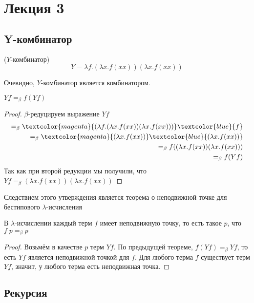\section{Лекция 3}

\subsection{Y-комбинатор}

\begin{definition}($Y$-комбинатор)
	\[
	Y = \lambda f . (\lambda x . f (x x)) (\lambda x . f (x x))
	\]
\end{definition}

Очевидно, $Y$-комбинатор является комбинатором.

\begin{theorem}
	$Y f =_{\beta} f (Y f)$
	
	\begin{proof}
		$\beta$-редуцируем выражение $Y f$
		\begin{align*}
			 =_{\beta} \textcolor{magenta}{(\lambda f . (\lambda x . f (x x)) (\lambda x . f (x x)))}\textcolor{blue}{f} \\ =_{\beta} \textcolor{magenta}{(\lambda x . f (x x))} \textcolor{blue}{(\lambda x . f (x x))} \\ =_{\beta} f ((\lambda x . f (x x))(\lambda x . f (x x))) \\ =_{\beta} f(Y f)
		\end{align*}
		Так как при второй редукции мы получили, что $Y f =_{\beta} (\lambda x . f (x x))(\lambda x . f (x x))$
	\end{proof}	
\end{theorem}

Следствием этого утверждения является теорема о неподвижной точке для бестипового $\lambda$-исчисления

\begin{theorem}
	В $\lambda$-исчислении каждый терм $f$ имеет неподвижную точку, то есть такое $p$, что $f \; p =_{\beta} p$
	
	\begin{proof}
		Возьмём в качестве $p$ терм $Y f$. По предыдущей теореме, $f(Y f) =_{\beta} Y f$, то есть $Y f$ является неподвижной точкой для $f$. Для любого терма $f$ существует терм $Y f$, значит, у любого терма есть неподвижная точка.
	\end{proof}
\end{theorem}

\subsection{Рекурсия}

